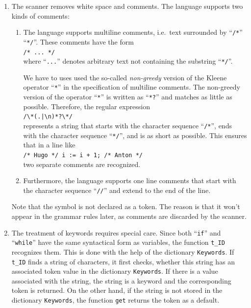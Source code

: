 \begin{enumerate}
\item The scanner removes white space and comments.  The language supports two kinds of comments:
      \begin{enumerate}
      \item The language supports multiline comments, i.e.~text surrounded by ``\texttt{/*}'' ``\texttt{*/}''.
            These comments have the form
            \\[0.2cm]
            \hspace*{1.3cm}
            \texttt{/* ... */}
            \\[0.2cm]
            where ``\texttt{...}'' denotes arbitrary text not containing the substring ``\texttt{*/}''.

            We have to uses used the so-called \emph{non-greedy} version of the
            Kleene operator ``\texttt{*}'' in the specification of multiline comments. The non-greedy version of the
            operator ``\texttt{*}'' is written as ``\texttt{*?}'' and matches as little as possible. Therefore, the
            regular expression 
            \\[0.2cm]
            \hspace*{1.3cm}
            \verb$/\*(.|\n)*?\*/$ %
            \\[0.2cm]
            represents a string that starts with the character sequence ``\texttt{/*}'', ends with the
            character sequence ``\texttt{*/}'', and is as short as possible. This ensures that in a line like
            \\[0.2cm]
            \hspace*{1.3cm}
            \texttt{/* Hugo */ i := i + 1; /* Anton */}
            \\[0.2cm]
            two separate comments are recognized.
      \item Furthermore, the language supports one line comments that start with the character sequence ``\texttt{//}''
            and extend to the end of the line.
      \end{enumerate}
      Note that the symbol  is not declared as a token.  The reason is that it won't appear in the grammar
      rules later, as comments are discarded by the scanner.
\item The treatment of keywords requires special care.  Since both ``\texttt{if}'' and ``\texttt{while}'' have
      the same syntactical form as variables, the function \texttt{t\_ID} recognizes them.  This is done with
      the help of the dictionary \texttt{Keywords}.  If \texttt{t\_ID} finds a string of characters, it first
      checks, whether this string has an associated token value in the dictionary \texttt{Keywords}.  If there
      is a value associated with the string, the string is a keyword and the corresponding token is returned.
      On the other hand, if the string is not stored in the dictionary \texttt{Keywords}, the function
      \texttt{get} returns the token  as a default. 
\end{enumerate}


